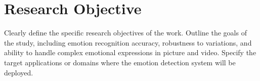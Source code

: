 \section{Research Objective}
\label{sec:research}

Clearly define the specific research objectives of the work.
Outline the goals of the study, including emotion recognition accuracy, robustness to variations, and ability to handle complex emotional expressions in picture and video.
Specify the target applications or domains where the emotion detection system will be deployed.
